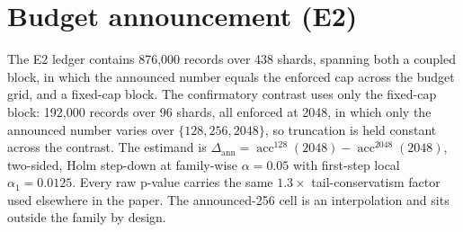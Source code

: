 \documentclass[11pt]{article}
\begin{document}
\section{Budget announcement (E2)}
\label{app:announce}

The E2 ledger contains 876,000 records over 438 shards, spanning both a coupled block, in which the
announced number equals the enforced cap across the budget grid, and a fixed-cap block. The confirmatory
contrast uses only the fixed-cap block: 192,000 records over 96 shards, all enforced at 2048, in which
only the announced number varies over \(\{128,256,2048\}\), so truncation is held constant across the
contrast.
The estimand is
\(\Delta_{\mathrm{ann}} = \operatorname{acc}^{128}(2048)-\operatorname{acc}^{2048}(2048)\),
two-sided, Holm step-down at family-wise \(\alpha=0.05\) with first-step local
\(\alpha_1=0.0125\). Every raw p-value carries the same \(1.3\times\)
tail-conservatism factor used elsewhere in the paper. The announced-256 cell is
an interpolation and sits outside the family by design.

\begin{table}[t]
\centering
\small
\caption{The E2 confirmatory family: four two-sided announcement dose contrasts
on Qwen3-8B at a fixed enforced cap of 2048. Formal outcome
\texttt{announcement\_effect\_detected}.}
\label{tab:e2}
\end{table}
\end{document}
